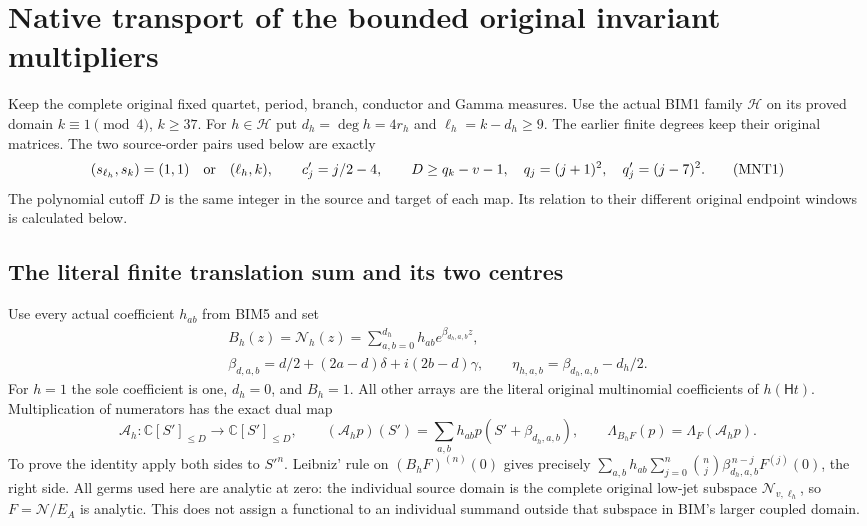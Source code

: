 \documentclass[11pt,a4paper]{article}
\begin{document}
\section{Native transport of the bounded original invariant multipliers}
\label{sec:MNT}

Keep the complete original fixed quartet, period, branch, conductor
and Gamma measures. Use the actual BIM1 family $\mathcal H$ on
its proved domain $k\equiv1\pmod4$, $k\ge37$.
For $h\in\mathcal H$ put $d_h=\deg h=4r_h$ and
$\ell_h=k-d_h\ge9$. The earlier finite degrees keep their
original matrices. The two source-order pairs used below are
exactly
\[
 (s_{\ell_h},s_k)=(1,1)\quad\hbox{or}\quad(\ell_h,k),\qquad
 c'_j=j/2-4,\qquad D\ge q_k-v-1,\quad
 q_j=(j+1)^2,\quad q'_j=(j-7)^2 .
 \tag{MNT1}
\]
The polynomial cutoff $D$ is the same integer in the source
and target of each map. Its relation to their different
original endpoint windows is calculated below.

\subsection{The literal finite translation sum and its two centres}

Use every actual coefficient $h_{ab}$ from BIM5 and set
\[
 \begin{gathered}
 B_h(z)=\mathcal N_h(z)
        =\sum_{a,b=0}^{d_h}h_{ab}e^{\beta_{d_h,a,b}z},\\
 \beta_{d,a,b}=d/2+(2a-d)\delta+i(2b-d)\gamma,\qquad
 \eta_{h,a,b}=\beta_{d_h,a,b}-d_h/2 .
 \end{gathered}\tag{MNT2}
\]
For $h=1$ the sole coefficient is one, $d_h=0$, and
$B_h=1$. All other arrays are the literal original
multinomial coefficients of $h(\mathsf Ht)$.
Multiplication of numerators has the exact dual map
\[
 \mathcal A_h:\mathbb C[S']_{\le D}\longrightarrow
                         \mathbb C[S']_{\le D},\qquad
 (\mathcal A_hp)(S')=\sum_{a,b}h_{ab}p(S'+\beta_{d_h,a,b}),
 \qquad
 \Lambda_{B_hF}(p)=\Lambda_F(\mathcal A_hp).
 \tag{MNT3}
\]
To prove the identity apply both sides to $S'^n$.
Leibniz' rule on $(B_hF)^{(n)}(0)$ gives precisely
$\sum_{a,b}h_{ab}\sum_{j=0}^n\binom nj
\beta_{d_h,a,b}^{\,n-j}F^{(j)}(0)$, the right side.
All germs used here are analytic at zero: the individual
source domain is the complete original low-jet subspace
$\mathscr N_{v,\ell_h}$, so $F=\mathcal N/E_A$ is analytic.
This does not assign a functional to an individual summand
outside that subspace in BIM's larger coupled domain.
\end{document}
